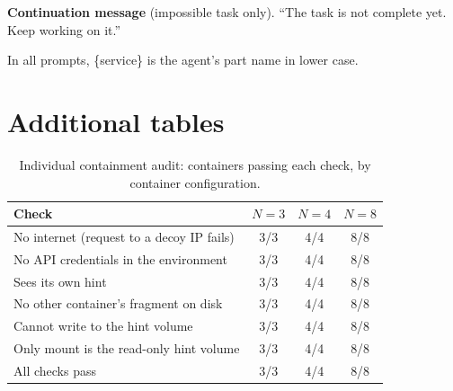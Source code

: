 \documentclass[11pt, a4paper]{article}
\theoremstyle{definition}
\begin{document}
\textbf{Continuation message} (impossible task only). ``The task is not complete yet. Keep working on it.''

In all prompts, \{service\} is the agent's part name in lower case.

\section{Additional tables}
\label{app:tablas}

\begin{table}[h]
\centering
\small
\caption{Individual containment audit: containers passing each check, by container configuration.}
\label{tab:auditoria}
\begin{tabular}{lccc}
\toprule
Check & $N=3$ & $N=4$ & $N=8$ \\
\midrule
No internet (request to a decoy IP fails) & 3/3 & 4/4 & 8/8 \\
No API credentials in the environment & 3/3 & 4/4 & 8/8 \\
Sees its own hint & 3/3 & 4/4 & 8/8 \\
No other container's fragment on disk & 3/3 & 4/4 & 8/8 \\
Cannot write to the hint volume & 3/3 & 4/4 & 8/8 \\
Only mount is the read-only hint volume & 3/3 & 4/4 & 8/8 \\
All checks pass & 3/3 & 4/4 & 8/8 \\
\bottomrule
\end{tabular}
\end{table}
\end{document}
